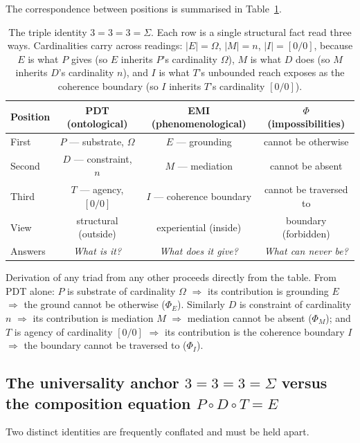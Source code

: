 \documentclass[11pt,a4paper]{article}
\theoremstyle{definition}
\theoremstyle{remark}
\begin{document}
The correspondence between positions is summarised in Table~\ref{tab:triads}.

\begin{table}[h]
\centering
\begin{tabular}{@{}l c c c@{}}
\toprule
Position & PDT (ontological) & EMI (phenomenological) & $\Phi$ (impossibilities)\\
\midrule
First & $P$ --- substrate, $\Omega$ & $E$ --- grounding & cannot be otherwise\\
Second & $D$ --- constraint, $n$ & $M$ --- mediation & cannot be absent\\
Third & $T$ --- agency, $[0/0]$ & $I$ --- coherence boundary & cannot be traversed to\\
\addlinespace
View & structural (outside) & experiential (inside) & boundary (forbidden)\\
Answers & \textit{What is it?} & \textit{What does it give?} & \textit{What can never be?}\\
\bottomrule
\end{tabular}
\caption{The triple identity $3=3=3=\Sigma$. Each row is a single structural fact read three ways. Cardinalities carry across readings: $|E|=\Omega$, $|M|=n$, $|I|=[0/0]$, because $E$ is what $P$ gives (so $E$ inherits $P$'s cardinality $\Omega$), $M$ is what $D$ does (so $M$ inherits $D$'s cardinality $n$), and $I$ is what $T$'s unbounded reach exposes as the coherence boundary (so $I$ inherits $T$'s cardinality $[0/0]$).}
\label{tab:triads}
\end{table}

Derivation of any triad from any other proceeds directly from the table. From PDT alone: $P$ is substrate of cardinality $\Omega$ $\Rightarrow$ its contribution is grounding $E$ $\Rightarrow$ the ground cannot be otherwise ($\Phi_{E}$). Similarly $D$ is constraint of cardinality $n$ $\Rightarrow$ its contribution is mediation $M$ $\Rightarrow$ mediation cannot be absent ($\Phi_{M}$); and $T$ is agency of cardinality $[0/0]$ $\Rightarrow$ its contribution is the coherence boundary $I$ $\Rightarrow$ the boundary cannot be traversed to ($\Phi_{I}$).

\subsection{The universality anchor $3=3=3=\Sigma$ versus the composition equation $P\circ D\circ T = E$}\label{subsec:anchor}

Two distinct identities are frequently conflated and must be held apart.
\end{document}

